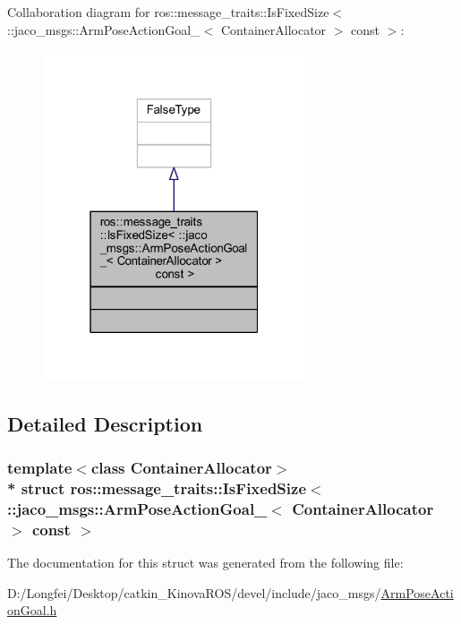 Collaboration diagram for ros\+:\+:message\+\_\+traits\+:\+:Is\+Fixed\+Size$<$ \+:\+:jaco\+\_\+msgs\+:\+:Arm\+Pose\+Action\+Goal\+\_\+$<$ Container\+Allocator $>$ const $>$\+:
\nopagebreak
\begin{figure}[H]
\begin{center}
\leavevmode
\includegraphics[width=220pt]{d7/dfe/structros_1_1message__traits_1_1IsFixedSize_3_01_1_1jaco__msgs_1_1ArmPoseActionGoal___3_01Contai64e15222f3f0cb5407386a79357f035c}
\end{center}
\end{figure}


\subsection{Detailed Description}
\subsubsection*{template$<$class Container\+Allocator$>$\\*
struct ros\+::message\+\_\+traits\+::\+Is\+Fixed\+Size$<$ \+::jaco\+\_\+msgs\+::\+Arm\+Pose\+Action\+Goal\+\_\+$<$ Container\+Allocator $>$ const  $>$}



The documentation for this struct was generated from the following file\+:\begin{DoxyCompactItemize}
\item 
D\+:/\+Longfei/\+Desktop/catkin\+\_\+\+Kinova\+R\+O\+S/devel/include/jaco\+\_\+msgs/\hyperlink{ArmPoseActionGoal_8h}{Arm\+Pose\+Action\+Goal.\+h}\end{DoxyCompactItemize}
